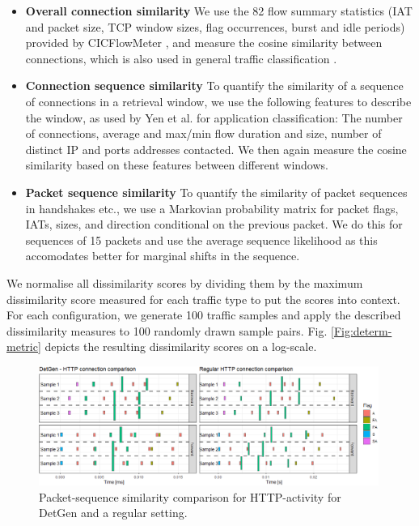 \documentclass[runningheads]{llncs}
\begin{document}
\begin{itemize}
\item \textbf{Overall connection similarity} We use the 82 flow summary statistics (IAT and packet size, TCP window sizes, flag occurrences, burst and idle periods) provided by CICFlowMeter \cite{lashkari2017characterization}, and measure the cosine similarity between connections, which is also used in general traffic classification \cite{aun2017review}.
\item \textbf{Connection sequence similarity} 
To quantify the similarity of a sequence of connections in a retrieval window, we use the following features to describe the window, as used by Yen et al. \cite{yen2009browser} for application classification: The number of connections, average and max/min flow duration and size, number of distinct IP and ports addresses contacted. We then again measure the cosine similarity based on these features between different windows. 
\item \textbf{Packet sequence similarity} To quantify the similarity of packet sequences in handshakes etc., we use a Markovian probability matrix for packet flags, IATs, sizes, and direction conditional on the previous packet. We do this for sequences of 15 packets and use the average sequence likelihood as this accomodates better for marginal shifts in the sequence. %
\end{itemize}

We normalise all dissimilarity scores by dividing them by the maximum dissimilarity score measured for each traffic type to put the scores into context.
For each configuration, we generate 100 traffic samples and apply the described dissimilarity measures to 100 randomly drawn sample pairs. Fig. \ref{Fig:determ-metric} depicts the resulting dissimilarity scores on a log-scale.

\begin{figure}
\centering
\includegraphics[width=0.99\textwidth]{images/Detgen_Reg_HTTP_comp_crop.png}
\caption{Packet-sequence similarity comparison for HTTP-activity for DetGen and a regular setting.}\label{Fig:HTTP-seq}
\end{figure}
\end{document}
